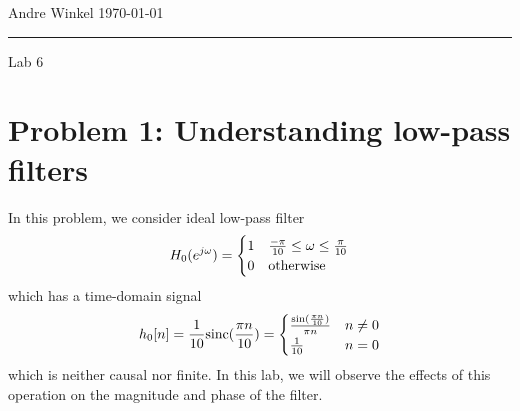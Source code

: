\documentclass[12pt]{article}
\begin{document}
\noindent Andre Winkel \hfill \today \\
\rule{\textwidth}{0.4pt} \vspace{0em}
\begin{center} \large{Lab 6} \end{center} \vspace*{0em}

\section*{Problem 1: Understanding low-pass filters}
In this problem, we consider ideal low-pass filter
\begin{equation} \notag
    H_0(e^{j\omega})=
    \begin{cases}
        1 & \frac{-\pi}{10}\le \omega \le \frac{\pi}{10}\\
        0 & \text{otherwise}
    \end{cases}
\end{equation}
which has a time-domain signal
\begin{equation} \notag
    h_0[n]=\frac{1}{10}\text{sinc}(\frac{\pi n}{10})=
    \begin{cases}
        \frac{\sin(\frac{\pi n}{10})}{\pi n} & n\ne0\\
        \frac{1}{10} & n=0
    \end{cases}
\end{equation}
which is neither causal nor finite. In this lab, we will observe the effects of this operation on the magnitude and phase of the filter. 
\end{document}
